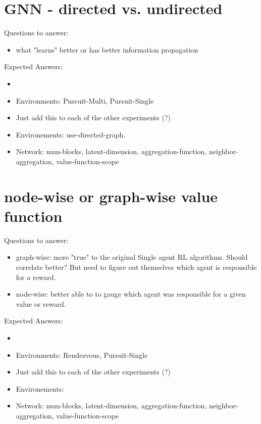 \section{GNN - directed vs. undirected}
Questions to answer:
\begin{itemize}[noitemsep,nolistsep]
    \item what "learns" better or has better information propagation
\end{itemize}
Expected Answers:
\begin{itemize}[noitemsep,nolistsep]
    \item 
\end{itemize}
\begin{itemize}[noitemsep,nolistsep]
    \item Environments: Pursuit-Multi, Pursuit-Single
    \item Just add this to each of the other experiments (?)
    \item Environements: use-directed-graph.
    \item Network: num-blocks, latent-dimension, aggregation-function, neighbor-aggregation, value-function-scope
\end{itemize}

\section{node-wise or graph-wise value function}
Questions to answer:
\begin{itemize}[noitemsep,nolistsep]
    \item graph-wise: more "true" to the original Single agent RL algorithms. Should correlate better? But need to figure out themselves which agent is responsible for a reward.
    \item node-wise: better able to to gauge which agent was responsible for a given value or reward. 
\end{itemize}
Expected Answers:
\begin{itemize}[noitemsep,nolistsep]
    \item 
\end{itemize}
\begin{itemize}[noitemsep,nolistsep]
    \item Environments: Rendezvous, Pursuit-Single
    \item Just add this to each of the other experiments (?)
    \item Environements: 
    \item Network: num-blocks, latent-dimension, aggregation-function, neighbor-aggregation, value-function-scope
\end{itemize}


